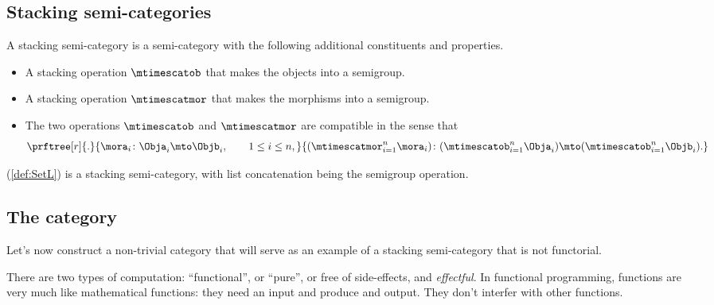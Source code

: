 \subsection{Stacking semi-categories}

\begin{ctdefinition}
    \label{def:stacking-semi-cat}
    A stacking semi-category is a semi-category with the following additional constituents and properties.

    \constit
    \begin{itemize}
        \item A stacking operation $\mtimescatob$ that makes the objects into a semigroup.
        \item A stacking operation $\mtimescatmor$ that makes the morphisms into a semigroup.
    \end{itemize}

    \condit
    \begin{itemize}
        \item The two operations $\mtimescatob$ and $\mtimescatmor$ are compatible in the sense that
        \begin{equation}
            \prftree[r]{.}{
                \mora_i \colon \Obja_i \mto \Objb_i, \qquad 1 \leq i \leq n,
            }{
               ( \mtimescatmor_{i=1}^n \mora_i )\colon( \mtimescatob_{i=1}^n \Obja_i) \mto (\mtimescatob_{i=1}^n \Objb_i).
            }
        \end{equation}
    \end{itemize}
\end{ctdefinition}

\begin{example}
    \SetStar (\cref{def:SetL}) is a stacking semi-category,
    with list concatenation being the semigroup operation.
\end{example}

\subsection{The \Effects category}

Let's now construct a non-trivial category that will serve as an example of a stacking semi-category that is not functorial.

There are two types of computation: ``functional'', or ``pure'', or free of side-effects, and \emph{effectful}.
In functional programming, functions are very much like mathematical functions: they need an input and produce and output. They don't interfer with other functions.

